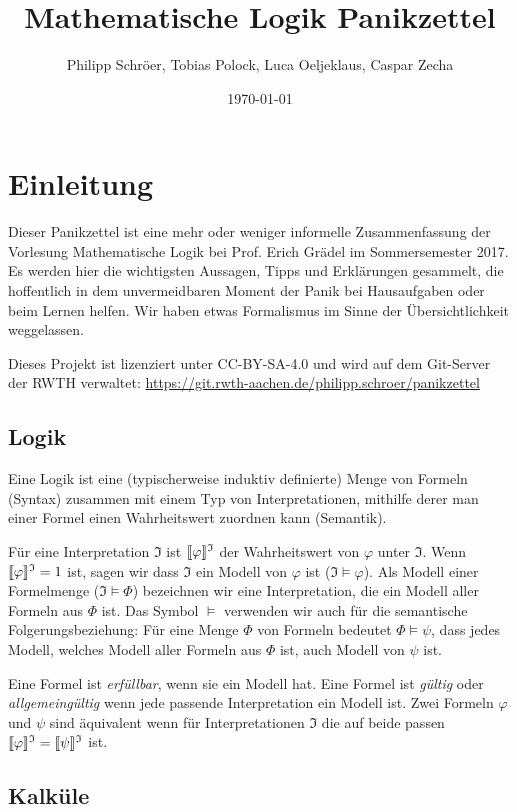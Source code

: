 \documentclass[a4paper,parskip=half*,DIV=15,fontsize=11pt]{scrartcl}
\title{Mathematische Logik Panikzettel}
\author{Philipp Schröer, Tobias Polock, Luca Oeljeklaus, Caspar Zecha}
\date{\today}
\DeclarePairedDelimiter\interpret{\llbracket}{\rrbracket}
\newcommand{\J}{\mathfrak{I}}
\begin{document}
\maketitle

\setcounter{tocdepth}{2}
\tableofcontents

\section{Einleitung}

Dieser Panikzettel ist eine mehr oder weniger informelle Zusammenfassung der Vorlesung Mathematische Logik bei Prof. Erich Grädel im Sommersemester 2017. Es werden hier die wichtigsten Aussagen, Tipps und Erklärungen gesammelt, die hoffentlich in dem unvermeidbaren Moment der Panik bei Hausaufgaben oder beim Lernen helfen. Wir haben etwas Formalismus im Sinne der Übersichtlichkeit weggelassen.

Dieses Projekt ist lizenziert unter CC-BY-SA-4.0 und wird auf dem Git-Server der RWTH verwaltet:
\url{https://git.rwth-aachen.de/philipp.schroer/panikzettel}

\subsection{Logik}
Eine Logik ist eine (typischerweise induktiv definierte) Menge von Formeln (Syntax) zusammen mit einem Typ von Interpretationen, mithilfe derer man einer Formel einen Wahrheitswert zuordnen kann (Semantik).

Für eine Interpretation $\J$ ist $\interpret{\varphi}^\J$ der Wahrheitswert von $\varphi$ unter $\J$. Wenn $\interpret{\varphi}^\J = 1$ ist, sagen wir dass $\J$ ein Modell von $\varphi$ ist ($\J \models \varphi$). Als Modell einer Formelmenge ($\J \models \Phi$) bezeichnen wir eine Interpretation, die ein Modell aller Formeln aus $\Phi$ ist. Das Symbol $\models$ verwenden wir auch für die semantische Folgerungsbeziehung: Für eine Menge $\Phi$ von Formeln bedeutet $\Phi \models \psi$, dass jedes Modell, welches Modell aller Formeln aus $\Phi$ ist, auch Modell von $\psi$ ist.

Eine Formel ist \emph{erfüllbar}, wenn sie ein Modell hat. Eine Formel ist \emph{gültig} oder \emph{allgemeingültig} wenn jede passende Interpretation ein Modell ist. Zwei Formeln $\varphi$ und $\psi$ sind äquivalent wenn für Interpretationen $\J$ die auf beide passen $\interpret{\varphi}^\J = \interpret{\psi}^\J$ ist.

\subsection{Kalküle}
\end{document}
